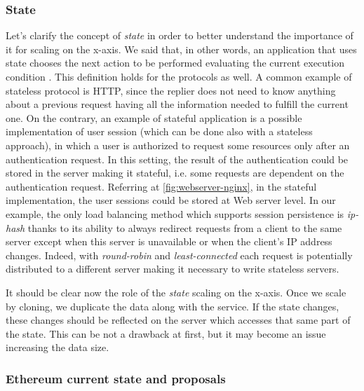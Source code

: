\subsubsection{State}
Let's clarify the concept of \emph{state} in order to better understand the
importance of it for scaling on the x-axis. We said that, in other words, an
application that uses state chooses the next action to be performed evaluating
the current execution condition \cite{bib:art-of-scalability}. This definition
holds for the protocols as well. A common example of stateless protocol is HTTP,
since the replier does not need to know anything about a previous request having
all the information needed to fulfill the current one. On the contrary, an
example of stateful application is a possible implementation of user session
(which can be done also with a stateless approach), in which a user is
authorized to request some resources only after an authentication request. In
this setting, the result of the authentication could be stored in the server
making it stateful, i.e. some requests are dependent on the authentication
request. Referring at \autoref{fig:webserver-nginx}, in the stateful
implementation, the user sessions could be stored at Web server level. In our
example, the only load balancing method which supports session persistence is
\emph{ip-hash} thanks to its ability to always redirect requests from a client
to the same server except when this server is unavailable or when the client's
IP address changes. Indeed, with \emph{round-robin} and \emph{least-connected}
each request is potentially distributed to a different server making it
necessary to write stateless servers.

It should be clear now the role of the \emph{state} scaling on the x-axis. Once
we scale by cloning, we duplicate the data along with the service. If the state
changes, these changes should be reflected on the server which accesses that
same part of the state. This can be not a drawback at first, but it may become
an issue increasing the data size.

\subsubsection{Ethereum current state and proposals}
\label{sec:x-axis-ethereum}

